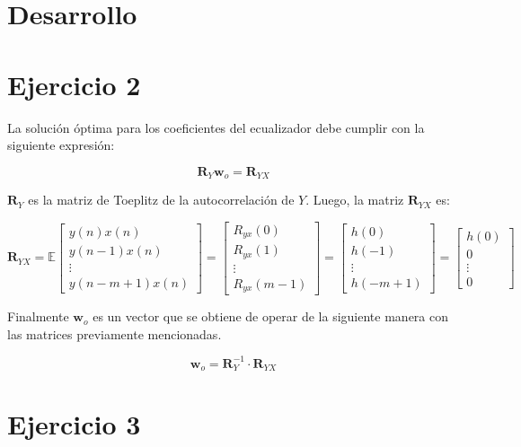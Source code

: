 \section{Desarrollo}

\section{Ejercicio 2}
La solución óptima para los coeficientes del ecualizador debe cumplir con la siguiente expresión:

\begin{equation}
	\textbf{R}_Y \textbf{w}_o = \textbf{R}_{YX}
\end{equation}

$\textbf{R}_Y$ es la matriz de Toeplitz de la autocorrelación de $Y$. Luego, la matriz $\textbf{R}_{YX}$ es: 

\[
\mathbf{R}_{YX} = \mathbb{E}
\begin{bmatrix}
	y(n) x(n) \\
	y(n-1) x(n) \\
	\vdots \\
	y(n - m + 1) x(n)
\end{bmatrix}
=
\begin{bmatrix}
	R_{yx}(0) \\
	R_{yx}(1) \\
	\vdots \\
	R_{yx}(m-1)
\end{bmatrix}
=
\begin{bmatrix}
	h(0) \\
	h(-1) \\
	\vdots \\
	h(-m+1)
\end{bmatrix}
=
\begin{bmatrix}
	h(0) \\
	0 \\
	\vdots \\
	0
\end{bmatrix}
\]

Finalmente $\textbf{w}_o$ es un vector que se obtiene de operar de la siguiente manera con las matrices previamente mencionadas.

\begin{equation}
	\textbf{w}_o = \textbf{R}_Y^{-1} \cdot \textbf{R}_{YX}
\end{equation}

\section{Ejercicio 3}

